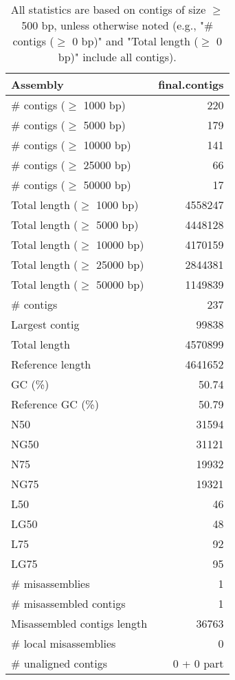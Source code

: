 \documentclass[12pt,a4paper]{article}
\begin{document}
\begin{table}[ht]
\begin{center}
\caption{All statistics are based on contigs of size $\geq$ 500 bp, unless otherwise noted (e.g., "\# contigs ($\geq$ 0 bp)" and "Total length ($\geq$ 0 bp)" include all contigs).}
\begin{tabular}{|l*{1}{|r}|}
\hline
Assembly & final.contigs \\ \hline
\# contigs ($\geq$ 1000 bp) & 220 \\ \hline
\# contigs ($\geq$ 5000 bp) & 179 \\ \hline
\# contigs ($\geq$ 10000 bp) & 141 \\ \hline
\# contigs ($\geq$ 25000 bp) & 66 \\ \hline
\# contigs ($\geq$ 50000 bp) & 17 \\ \hline
Total length ($\geq$ 1000 bp) & 4558247 \\ \hline
Total length ($\geq$ 5000 bp) & 4448128 \\ \hline
Total length ($\geq$ 10000 bp) & 4170159 \\ \hline
Total length ($\geq$ 25000 bp) & 2844381 \\ \hline
Total length ($\geq$ 50000 bp) & 1149839 \\ \hline
\# contigs & 237 \\ \hline
Largest contig & 99838 \\ \hline
Total length & 4570899 \\ \hline
Reference length & 4641652 \\ \hline
GC (\%) & 50.74 \\ \hline
Reference GC (\%) & 50.79 \\ \hline
N50 & 31594 \\ \hline
NG50 & 31121 \\ \hline
N75 & 19932 \\ \hline
NG75 & 19321 \\ \hline
L50 & 46 \\ \hline
LG50 & 48 \\ \hline
L75 & 92 \\ \hline
LG75 & 95 \\ \hline
\# misassemblies & 1 \\ \hline
\# misassembled contigs & 1 \\ \hline
Misassembled contigs length & 36763 \\ \hline
\# local misassemblies & 0 \\ \hline
\# unaligned contigs & 0 + 0 part \\ \hline

\end{tabular}
\end{center}
\end{table}
\end{document}
